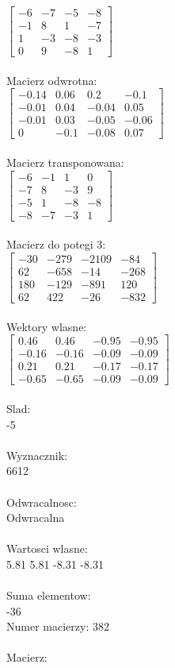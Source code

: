\documentclass[a4paper,12pt]{article}
\begin{document}
$\begin{bmatrix} -6&-7&-5&-8\\-1&8&1&-7\\1&-3&-8&-3\\0&9&-8&1 \end{bmatrix}$
\\
\\
Macierz odwrotna:\\

$\begin{bmatrix} -0.14&0.06&0.2&-0.1\\-0.01&0.04&-0.04&0.05\\-0.01&0.03&-0.05&-0.06\\0&-0.1&-0.08&0.07 \end{bmatrix}$
\\
\\
Macierz transponowana:\\

$\begin{bmatrix} -6&-1&1&0\\-7&8&-3&9\\-5&1&-8&-8\\-8&-7&-3&1 \end{bmatrix}$
\\
\\
Macierz do potegi 3:\\

$\begin{bmatrix} -30&-279&-2109&-84\\62&-658&-14&-268\\180&-129&-891&120\\62&422&-26&-832 \end{bmatrix}$
\\
\\
Wektory wlasne:\\

$\begin{bmatrix} 0.46&0.46&-0.95&-0.95\\-0.16&-0.16&-0.09&-0.09\\0.21&0.21&-0.17&-0.17\\-0.65&-0.65&-0.09&-0.09 \end{bmatrix}$
\\
\\
Slad:\\
-5
\\
\\
Wyznacznik:\\
6612
\\
\\
Odwracalnosc:\\
Odwracalna
\\
\\
Wartosci wlasne:\\
5.81 5.81 -8.31 -8.31
\\
\\
Suma elementow:\\
-36
\\
\newpage
Numer macierzy:
382
\\
\\
Macierz:\\
\end{document}

